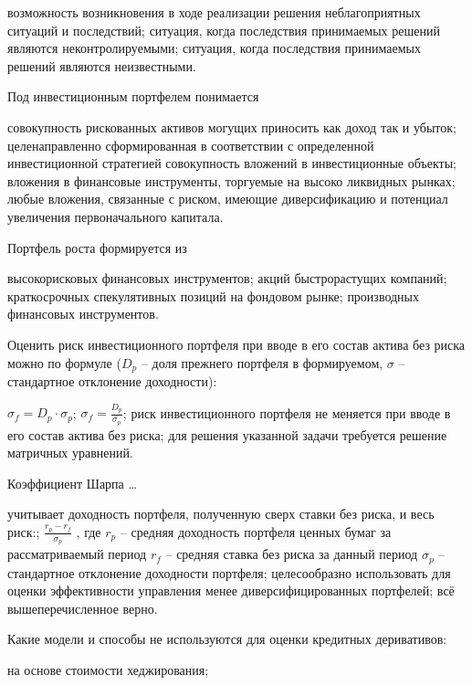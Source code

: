 \documentclass[12pt, table]{exam}
\begin{document}
\begin{questions}
\begin{multicols}{2}
\begin{choices}
	 \choice возможность возникновения в ходе реализации решения неблагоприятных ситуаций и последствий;
	 \choice ситуация, когда последствия принимаемых решений являются неконтролируемыми;
	 \choice ситуация, когда последствия принимаемых решений являются неизвестными.
	 \end{choices}
\question Под инвестиционным портфелем понимается
	 \begin{choices}
	 \choice совокупность рискованных активов могущих приносить как доход так и убыток;
	 \CC целенаправленно сформированная в соответствии с определенной инвестиционной стратегией совокупность вложений в инвестиционные объекты;
	 \choice вложения в финансовые инструменты, торгуемые на высоко ликвидных рынках;
	 \choice любые вложения, связанные с риском, имеющие диверсификацию и потенциал увеличения первоначального капитала.
	 \end{choices}
\question Портфель роста формируется из
	 \begin{choices}
	 \choice высокорисковых финансовых инструментов;
	 \CC акций быстрорастущих компаний;
	 \choice краткосрочных спекулятивных позиций на фондовом рынке;
	 \choice производных финансовых инструментов.
	 \end{choices}
\question Оценить риск инвестиционного портфеля при вводе в его состав актива без риска можно по формуле ($D_p$ – доля прежнего портфеля в формируемом, $\sigma$ – стандартное отклонение доходности):
	 \begin{choices}
	 \CC $\sigma_f=D_p \cdot \sigma_p$;
	 \choice $\sigma_f=\frac{D_p}{\sigma_p}$;
	 \choice риск инвестиционного портфеля не меняется при вводе в его состав актива без риска;
	 \choice для решения указанной задачи требуется решение матричных уравнений.
	 \end{choices}
\question Коэффициент Шарпа …
	 \begin{choices}
	 \choice учитывает доходность портфеля, полученную сверх ставки без риска, и весь риск:;
	 \choice $\frac{r_p - r_f}{\sigma_p}$ , где $r_p$ – средняя доходность портфеля ценных бумаг за рассматриваемый период $r_f$ – средняя ставка без риска за данный период $\sigma_p$ – стандартное отклонение доходности портфеля;
	 \choice целесообразно использовать для оценки эффективности управления менее диверсифицированных портфелей;
	 \CC всё вышеперечисленное верно.
	 \end{choices}
\question Какие модели и способы не используются для оценки кредитных деривативов:
	 \begin{choices}
	 \choice на основе стоимости хеджирования;

\end{choices}
\end{multicols}
\end{questions}
\end{document}
